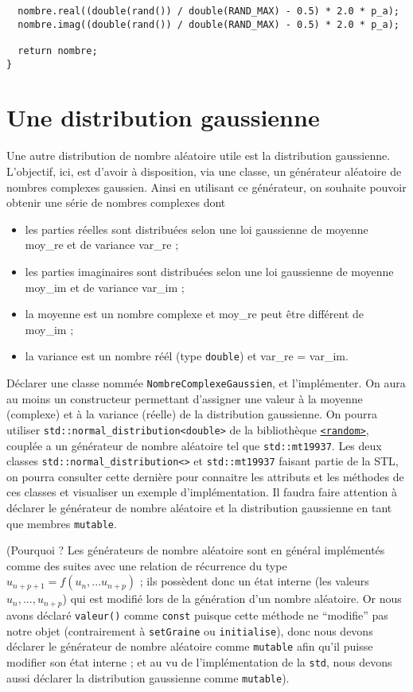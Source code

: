 \documentclass{book}
\newcommand{\inline}[1]{\texttt{#1}}
\begin{document}
\begin{correction}
\begin{verbatim}
  nombre.real((double(rand()) / double(RAND_MAX) - 0.5) * 2.0 * p_a);
  nombre.imag((double(rand()) / double(RAND_MAX) - 0.5) * 2.0 * p_a);

  return nombre;
}
\end{verbatim}
\end{correction}

\renewenvironment{correction}{}{}

\section{Une distribution gaussienne}

Une autre distribution de nombre aléatoire utile est la distribution gaussienne. L'objectif, ici, est d'avoir à disposition, via une classe, un générateur aléatoire de nombres complexes gaussien. Ainsi en utilisant ce générateur, on souhaite pouvoir obtenir une série de nombres complexes dont
\begin{itemize}
\item les parties réelles sont distribuées selon une loi gaussienne de moyenne moy\_re et de variance var\_re ;
\item les parties imaginaires sont distribuées selon une loi gaussienne de moyenne moy\_im et de variance var\_im ;
\item la moyenne est un nombre complexe et moy\_re peut être différent de moy\_im ;
\item la variance est un nombre réél (type \inline{double}) et var\_re = var\_im.
\end{itemize}

Déclarer une classe nommée \inline{NombreComplexeGaussien}, et l'implémenter. On aura au moins un constructeur permettant d'assigner une valeur à la moyenne (complexe) et à la variance (réelle) de la distribution gaussienne. On pourra utiliser \inline{std::normal_distribution<double>} de la bibliothèque \href{http://en.cppreference.com/w/cpp/header/random}{\inline{<random>}}, couplée a un générateur de nombre aléatoire tel que \inline{std::mt19937}. Les deux classes  \inline{std::normal_distribution<>} et \inline{std::mt19937} faisant partie de la STL, on pourra consulter cette dernière pour connaitre les attributs et les méthodes de ces classes et visualiser un exemple d'implémentation. Il faudra faire attention à déclarer le générateur de nombre aléatoire et la distribution gaussienne en tant que membres \inline{mutable}. 

(Pourquoi ? Les générateurs de nombre aléatoire sont en général implémentés comme des suites avec une relation de récurrence du type $u_{n+p+1} = f(u_n, ... u_{n+p})$ ; ils possèdent donc un état interne (les valeurs $u_n, ..., u_{n+p}$) qui est modifié lors de la génération d'un nombre aléatoire. Or nous avons déclaré \inline{valeur()} comme \inline{const} puisque cette méthode ne ``modifie'' pas notre objet (contrairement à \inline{setGraine} ou \inline{initialise}), donc nous devons déclarer le générateur de nombre aléatoire comme \inline{mutable} afin qu'il puisse modifier son état interne ; et au vu de l'implémentation de la \inline{std}, nous devons aussi déclarer la distribution gaussienne comme \inline{mutable}). 
\end{document}

